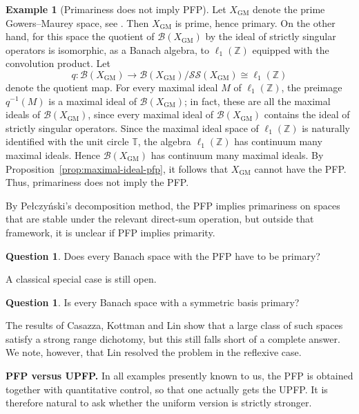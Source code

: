 \documentclass[11pt]{amsart}
\newcommand{\runinhead}[1]{%
  \par\medskip\noindent\textbf{#1.}\enspace\ignorespaces
}
\theoremstyle{plain}
\theoremstyle{definition}
\newtheorem{question}[theorem]{Question}
\newtheorem{example}[theorem]{Example}
\numberwithin{equation}{section}
\newcommand{\Bop}{\mathcal{B}}
\begin{document}
\begin{example}[Primariness does not imply PFP]
    Let $X_{\mathrm{GM}}$ denote the prime Gowers--Maurey space, see \cite{GowersMaureySmallOperators}. Then $X_{\mathrm{GM}}$ is prime, hence primary. On the other hand, for this space the quotient of $\Bop(X_{\mathrm{GM}})$ by the ideal of strictly singular operators is isomorphic, as a Banach algebra, to $\ell_1(\mathbb Z)$ equipped with the convolution product. Let
    \begin{equation*}
        q\colon \Bop(X_{\mathrm{GM}})\to \Bop(X_{\mathrm{GM}})/\mathcal{SS}(X_{\mathrm{GM}})\cong \ell_1(\mathbb Z)
    \end{equation*}
    denote the quotient map. For every maximal ideal $M$ of $\ell_1(\mathbb Z)$, the preimage $q^{-1}(M)$ is a maximal ideal of $\Bop(X_{\mathrm{GM}})$; in fact, these are all the maximal ideals of $\Bop(X_{\mathrm{GM}})$, since every maximal ideal of $\Bop(X_{\mathrm{GM}})$ contains the ideal of strictly singular operators. Since the maximal ideal space of $\ell_1(\mathbb Z)$ is naturally identified with the unit circle $\mathbb T$, the algebra $\ell_1(\mathbb Z)$ has continuum many maximal ideals. Hence $\Bop(X_{\mathrm{GM}})$ has continuum many maximal ideals. By Proposition~\ref{prop:maximal-ideal-pfp}, it follows that $X_{\mathrm{GM}}$ cannot have the PFP. Thus, primariness does not imply the PFP.
\end{example}


By Pe{\l}czy\'nski's decomposition method, the PFP implies primariness on spaces that are stable under the relevant direct-sum operation, but outside that framework, it is unclear if PFP implies primarity.

\begin{question}
Does every Banach space with the PFP have to be primary?
\end{question}

A classical special case is still open.

\begin{question}
Is every Banach space with a symmetric basis primary?
\end{question}

The results of Casazza, Kottman and Lin show that a large class of such spaces satisfy a strong range dichotomy, but this still falls short of a complete answer. We note, however, that Lin \cite{Lin1992} resolved the problem in the reflexive case.

\runinhead{PFP versus UPFP} In all examples presently known to us, the PFP is obtained together with quantitative control,
so that one actually gets the UPFP.
It is therefore natural to ask whether the uniform version is strictly stronger.
\end{document}
